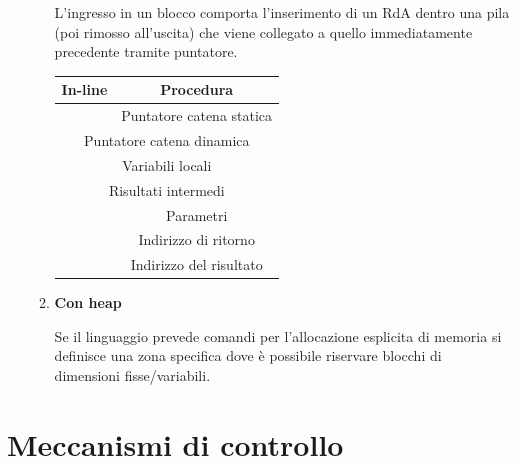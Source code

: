 \documentclass{article}
\begin{document}
\begin{enumerate}
\begin{enumerate}
                \begin{minipage}[t]{0.65\linewidth}
                L'ingresso in un blocco comporta l'inserimento di un RdA dentro una pila (poi rimosso all'uscita) che viene collegato a quello immediatamente precedente tramite puntatore.
                \end{minipage}
                \hfill
                \begin{minipage}[t]{0.3\linewidth}
                    \centering
                    \begin{tabular}[t]{|c|c|}
                        \hline
                        \textbf{In-line} & \textbf{Procedura}\\
                        \hline
                         & Puntatore catena statica \\
                        \hline
                        \multicolumn{2}{|c|}{Puntatore catena dinamica} \\
                        \hline
                        \multicolumn{2}{|c|}{Variabili locali}\\
                        \hline
                        \multicolumn{2}{|c|}{Risultati intermedi} \\
                        \hline
                         & Parametri \\
                        \hline
                         & Indirizzo di ritorno \\
                        \hline
                         & Indirizzo del risultato \\
                        \hline
                    \end{tabular}
                \end{minipage}
            
            \item \textbf{Con heap}

                Se il linguaggio prevede comandi per l'allocazione esplicita di memoria si definisce una zona specifica dove è possibile riservare blocchi di dimensioni fisse/variabili.
            
        \end{enumerate}

\newpage
    
\end{enumerate}

\section{Meccanismi di controllo}
\end{document}
